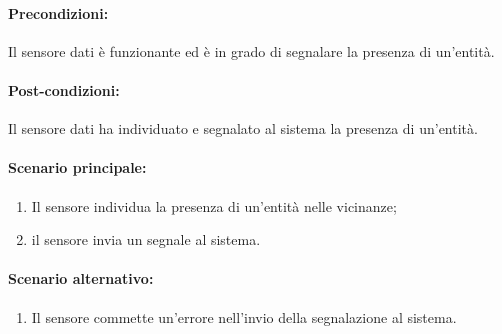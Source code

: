 \paragraph{Precondizioni:}
Il sensore dati è funzionante ed è in grado di segnalare la presenza di un'entità.

\paragraph{Post-condizioni:}
Il sensore dati ha individuato e segnalato al sistema la presenza di un'entità.

\paragraph{Scenario principale:}
\begin{enumerate}
    \item Il sensore individua la presenza di un'entità nelle vicinanze;
    \item il sensore invia un segnale al sistema.
\end{enumerate}

\paragraph{Scenario alternativo:}
\begin{enumerate}
    \item Il sensore commette un'errore nell'invio della segnalazione al sistema.
\end{enumerate}

